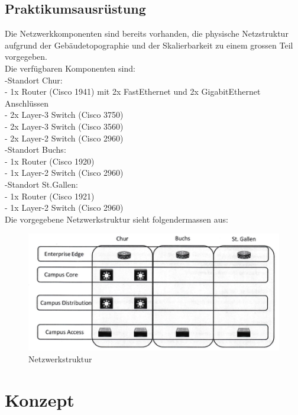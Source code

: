 \documentclass[12pt,a4paper,titlepage]{article}
\begin{document}
\subsection{Praktikumsausrüstung} 
Die Netzwerkkomponenten sind bereits vorhanden, die physische Netzstruktur aufgrund der Gebäudetopographie und der Skalierbarkeit zu einem grossen Teil vorgegeben.\\
\newline
Die verfügbaren Komponenten sind:\\
\newline
-Standort Chur:\\
- 1x Router (Cisco 1941) mit 2x FastEthernet und 2x GigabitEthernet Anschlüssen\\
- 2x Layer-3 Switch (Cisco 3750)\\
- 2x Layer-3 Switch (Cisco 3560)\\
- 2x Layer-2 Switch (Cisco 2960)\\
\newline
-Standort Buchs:\\
- 1x Router (Cisco 1920)\\
- 1x Layer-2 Switch (Cisco 2960)\\
\newline
-Standort St.Gallen:\\
- 1x Router (Cisco 1921)\\
- 1x Layer-2 Switch (Cisco 2960)\\
\newline
Die vorgegebene Netzwerkstruktur sieht folgendermassen aus:
\begin{figure} [H]
\centering
\includegraphics{Netzwerkstruktur.png}
\caption{Netzwerkstruktur}
\label{abb: Netzwerksturktur}
\end{figure}
\newpage

\section{Konzept}
\end{document}
